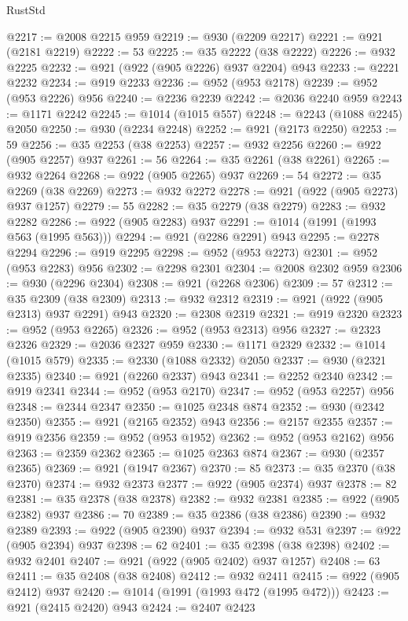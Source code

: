 \begin{lexlean}{RustStd}
\begin{coremodule}
@2217 := @2008 @2215 @959
@2219 := @930 (@2209 @2217)
@2221 := @921 (@2181 @2219)
@2222 := 53
@2225 := @35 @2222 (@38 @2222)
@2226 := @932 @2225
@2232 := @921 (@922 (@905 @2226) @937 @2204) @943
@2233 := @2221 @2232
@2234 := @919 @2233
@2236 := @952 (@953 @2178)
@2239 := @952 (@953 @2226) @956
@2240 := @2236 @2239
@2242 := @2036 @2240 @959
@2243 := @1171 @2242
@2245 := @1014 (@1015 @557)
@2248 := @2243 (@1088 @2245) @2050
@2250 := @930 (@2234 @2248)
@2252 := @921 (@2173 @2250)
@2253 := 59
@2256 := @35 @2253 (@38 @2253)
@2257 := @932 @2256
@2260 := @922 (@905 @2257) @937
@2261 := 56
@2264 := @35 @2261 (@38 @2261)
@2265 := @932 @2264
@2268 := @922 (@905 @2265) @937
@2269 := 54
@2272 := @35 @2269 (@38 @2269)
@2273 := @932 @2272
@2278 := @921 (@922 (@905 @2273) @937 @1257)
@2279 := 55
@2282 := @35 @2279 (@38 @2279)
@2283 := @932 @2282
@2286 := @922 (@905 @2283) @937
@2291 := @1014 (@1991 (@1993 @563 (@1995 @563)))
@2294 := @921 (@2286 @2291) @943
@2295 := @2278 @2294
@2296 := @919 @2295
@2298 := @952 (@953 @2273)
@2301 := @952 (@953 @2283) @956
@2302 := @2298 @2301
@2304 := @2008 @2302 @959
@2306 := @930 (@2296 @2304)
@2308 := @921 (@2268 @2306)
@2309 := 57
@2312 := @35 @2309 (@38 @2309)
@2313 := @932 @2312
@2319 := @921 (@922 (@905 @2313) @937 @2291) @943
@2320 := @2308 @2319
@2321 := @919 @2320
@2323 := @952 (@953 @2265)
@2326 := @952 (@953 @2313) @956
@2327 := @2323 @2326
@2329 := @2036 @2327 @959
@2330 := @1171 @2329
@2332 := @1014 (@1015 @579)
@2335 := @2330 (@1088 @2332) @2050
@2337 := @930 (@2321 @2335)
@2340 := @921 (@2260 @2337) @943
@2341 := @2252 @2340
@2342 := @919 @2341
@2344 := @952 (@953 @2170)
@2347 := @952 (@953 @2257) @956
@2348 := @2344 @2347
@2350 := @1025 @2348 @874
@2352 := @930 (@2342 @2350)
@2355 := @921 (@2165 @2352) @943
@2356 := @2157 @2355
@2357 := @919 @2356
@2359 := @952 (@953 @1952)
@2362 := @952 (@953 @2162) @956
@2363 := @2359 @2362
@2365 := @1025 @2363 @874
@2367 := @930 (@2357 @2365)
@2369 := @921 (@1947 @2367)
@2370 := 85
@2373 := @35 @2370 (@38 @2370)
@2374 := @932 @2373
@2377 := @922 (@905 @2374) @937
@2378 := 82
@2381 := @35 @2378 (@38 @2378)
@2382 := @932 @2381
@2385 := @922 (@905 @2382) @937
@2386 := 70
@2389 := @35 @2386 (@38 @2386)
@2390 := @932 @2389
@2393 := @922 (@905 @2390) @937
@2394 := @932 @531
@2397 := @922 (@905 @2394) @937
@2398 := 62
@2401 := @35 @2398 (@38 @2398)
@2402 := @932 @2401
@2407 := @921 (@922 (@905 @2402) @937 @1257)
@2408 := 63
@2411 := @35 @2408 (@38 @2408)
@2412 := @932 @2411
@2415 := @922 (@905 @2412) @937
@2420 := @1014 (@1991 (@1993 @472 (@1995 @472)))
@2423 := @921 (@2415 @2420) @943
@2424 := @2407 @2423

\end{coremodule}
\end{lexlean}

